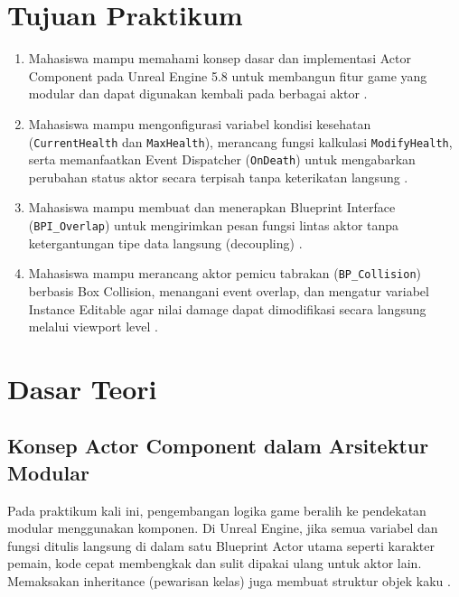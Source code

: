 \documentclass[a4paper,oneside,12pt]{report}
\begin{document}
\thispagestyle{empty}
\clearpage
{}
\thispagestyle{empty}

\tableofcontents
\clearpage

\setcounter{page}{3}

\chapter[Tujuan Praktikum]{Tujuan Praktikum}
\begin{enumerate}
   \item Mahasiswa mampu memahami konsep dasar dan implementasi Actor Component pada Unreal Engine 5.8 untuk membangun fitur game yang modular dan dapat digunakan kembali pada berbagai aktor \cite{modul4,epic-components}.
   \item Mahasiswa mampu mengonfigurasi variabel kondisi kesehatan (\texttt{CurrentHealth} dan \texttt{MaxHealth}), merancang fungsi kalkulasi \texttt{ModifyHealth}, serta memanfaatkan Event Dispatcher (\texttt{OnDeath}) untuk mengabarkan perubahan status aktor secara terpisah tanpa keterikatan langsung \cite{modul4,epic-dispatchers}.
   \item Mahasiswa mampu membuat dan menerapkan Blueprint Interface (\texttt{BPI\_Overlap}) untuk mengirimkan pesan fungsi lintas aktor tanpa ketergantungan tipe data langsung (decoupling) \cite{modul4,epic-interface}.
   \item Mahasiswa mampu merancang aktor pemicu tabrakan (\texttt{BP\_Collision}) berbasis Box Collision, menangani event overlap, dan mengatur variabel Instance Editable agar nilai damage dapat dimodifikasi secara langsung melalui viewport level \cite{modul4,epic-collision,epic-variables}.
\end{enumerate}
\clearpage

\chapter{Dasar Teori}

\section{Konsep Actor Component dalam Arsitektur Modular}
Pada praktikum kali ini, pengembangan logika game beralih ke pendekatan modular menggunakan komponen. Di Unreal Engine, jika semua variabel dan fungsi ditulis langsung di dalam satu Blueprint Actor utama seperti karakter pemain, kode cepat membengkak dan sulit dipakai ulang untuk aktor lain. Memaksakan inheritance (pewarisan kelas) juga membuat struktur objek kaku \cite{epic-components}.
\end{document}
